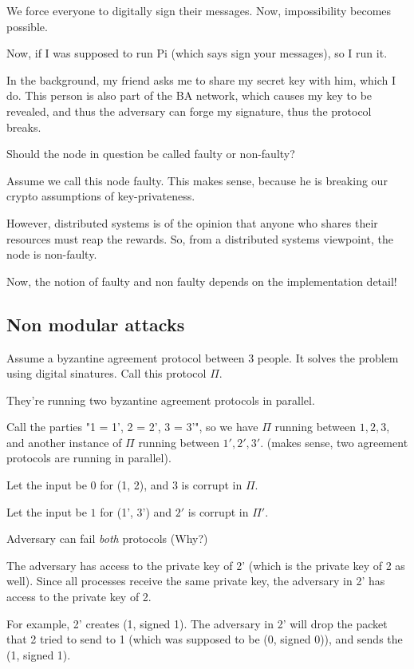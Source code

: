 \documentclass[11pt]{article}
\begin{document}
We force everyone to digitally sign their messages. Now, impossibility becomes
possible.

Now, if I was supposed to run Pi (which says sign your messages), so I run it.


In the background, my friend asks me to share my secret key with him, which I do.
This person is also part of the BA network, which causes my key to be revealed,
and thus the adversary can forge my signature, thus the protocol breaks.


Should the node in question be called faulty or non-faulty?

Assume we call this node faulty. This makes sense, because he is breaking our
crypto assumptions of key-privateness.

However, distributed systems is of the opinion that anyone who shares their
resources must reap the rewards. So, from a distributed systems viewpoint,
the node is non-faulty.

Now, the notion of faulty and non faulty depends on the implementation detail!


\subsection{Non modular attacks}
Assume a byzantine agreement protocol between 3 people. It solves the problem
using digital sinatures. Call this protocol $\Pi$.


They're running two byzantine agreement protocols in parallel.

Call the parties "1 = 1', 2 = 2', 3 = 3'", so we have $\Pi$ running
between $1, 2, 3$, and another instance of $\Pi$ running between
$1', 2', 3'$. (makes sense, two agreement protocols are running in parallel).


Let the input be $0$ for (1, 2), and $3$ is corrupt in $\Pi$.

Let the input be $1$ for (1', 3') and $2'$ is corrupt in $\Pi'$.


Adversary can fail \textit{both} protocols (Why?)

The adversary has access to the private key of 2' (which is the private key
of 2 as well). Since all processes receive the same private key, the adversary
in 2' has access to the private key of 2.

For example, 2' creates (1, signed 1). The adversary in 2' will drop the packet
that 2 tried to send to 1 (which was supposed to be (0, signed 0)),
and sends the (1, signed 1).
\end{document}
